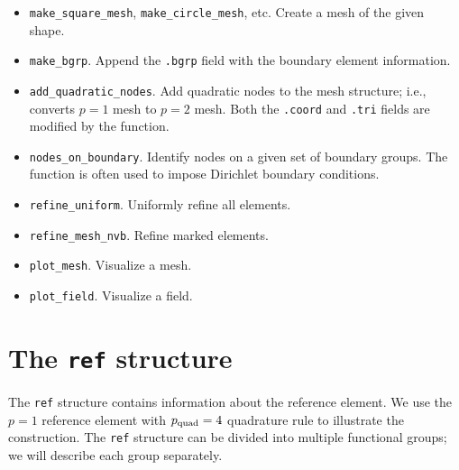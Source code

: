 \documentclass[openany,preprint,11pt]{article}
\begin{document}
\begin{itemize}
\item \texttt{make\_square\_mesh}, \texttt{make\_circle\_mesh}, etc. Create a mesh of the given shape.
\item \texttt{make\_bgrp}. Append the \texttt{.bgrp} field with the boundary element information. 
\item \texttt{add\_quadratic\_nodes}.  Add quadratic nodes to the mesh structure; i.e., converts $p=1$ mesh to $p=2$ mesh.  Both the \texttt{.coord} and \texttt{.tri} fields are modified by the function.
\item \texttt{nodes\_on\_boundary}.  Identify nodes on a given set of boundary groups.  The function is often used to impose Dirichlet boundary conditions.
\item \texttt{refine\_uniform}. Uniformly refine all elements.
\item \texttt{refine\_mesh\_nvb}. Refine marked elements.
\item \texttt{plot\_mesh}.  Visualize a mesh.
\item \texttt{plot\_field}. Visualize a field.
\end{itemize}

\section{The \texttt{ref} structure}
The \texttt{ref} structure contains information about the reference element.  We use the $p=1$ reference element with $p_{\rm quad} = 4$ quadrature rule to illustrate the construction.  The \texttt{ref} structure can be divided into multiple functional groups; we will describe each group separately.
\end{document}
